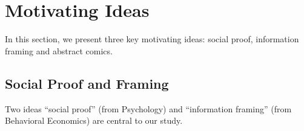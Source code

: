 \section{Motivating Ideas}
\label{sec:Motivating Ideas}
In this section, we present three key motivating ideas: social proof, information framing and abstract comics.

\subsection{Social Proof and Framing}
Two ideas ``social proof'' (from Psychology) and ``information framing'' (from Behavioral Economics) are central to our study.
\begin{description}


\end{description}

